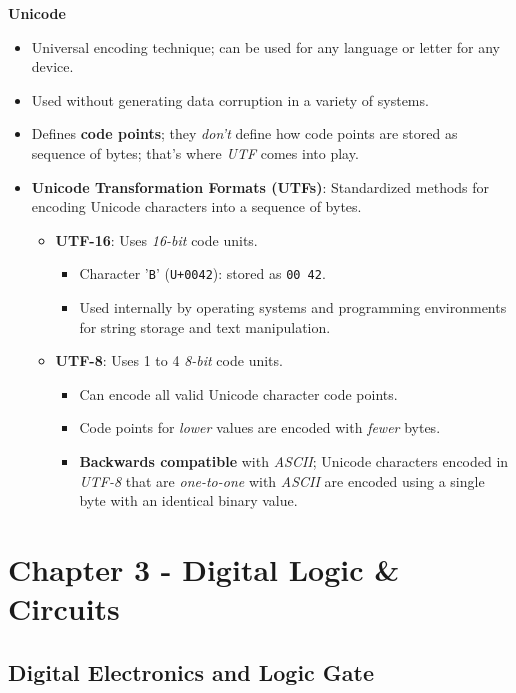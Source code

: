\documentclass[12pt, letterpaper]{article}
\begin{document}
\textbf{Unicode}
    \begin{itemize}
        \item Universal encoding technique; can be used for any language or letter for any device.
        \item Used without generating data corruption in a variety of systems.
        \item Defines \textbf{code points}; they \textit{don't} define how code points are stored as sequence of bytes; that's where \textit{UTF} comes into play.
        \item \textbf{Unicode Transformation Formats (UTFs)}: Standardized methods for encoding Unicode characters into a sequence of bytes.
            \begin{itemize}
                \item \textbf{UTF-16}: Uses \textit{16-bit} code units.
                    \begin{itemize}
                        \item Character '\texttt{B}' (\texttt{U+0042}): stored as \texttt{00 42}.
                        \item Used internally by operating systems and programming environments for string storage and text manipulation.
                    \end{itemize}
                \item \textbf{UTF-8}: Uses 1 to 4 \textit{8-bit} code units.
                    \begin{itemize}
                        \item Can encode all valid Unicode character code points.
                        \item Code points for \textit{lower} values are encoded with \textit{fewer} bytes.
                        \item \textbf{Backwards compatible} with \textit{ASCII}; Unicode characters encoded in \textit{UTF-8} that are \textit{one-to-one} with \textit{ASCII} are encoded using a single byte with an identical binary value.
                    \end{itemize}
            \end{itemize}
    \end{itemize}

\section*{Chapter 3 - Digital Logic \& Circuits}

\subsection*{Digital Electronics and Logic Gate}
\end{document}
